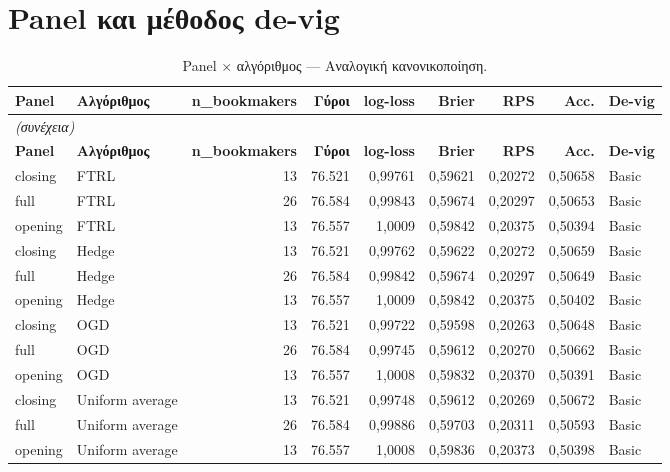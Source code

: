 \section{Panel και μέθοδος de-vig}
{\scriptsize
\begin{longtable}{@{}llrrrrrrl@{}}
\caption{Panel $\times$ αλγόριθμος --- Αναλογική κανονικοποίηση.}\label{app:opening_vs_cΑναλ}\\
\toprule \textbf{Panel} & \textbf{Αλγόριθμος} & \textbf{n\_bookmakers} & \textbf{Γύροι} & \textbf{log-loss} & \textbf{Brier} & \textbf{RPS} & \textbf{Acc.} & \textbf{De-vig} \\\midrule\endfirsthead
\multicolumn{9}{l}{\emph{(συνέχεια)}}\\\toprule \textbf{Panel} & \textbf{Αλγόριθμος} & \textbf{n\_bookmakers} & \textbf{Γύροι} & \textbf{log-loss} & \textbf{Brier} & \textbf{RPS} & \textbf{Acc.} & \textbf{De-vig} \\\midrule\endhead
\bottomrule\endfoot
closing & FTRL & 13 & 76.521 & 0,99761 & 0,59621 & 0,20272 & 0,50658 & Basic \\
full & FTRL & 26 & 76.584 & 0,99843 & 0,59674 & 0,20297 & 0,50653 & Basic \\
opening & FTRL & 13 & 76.557 & 1,0009 & 0,59842 & 0,20375 & 0,50394 & Basic \\
closing & Hedge & 13 & 76.521 & 0,99762 & 0,59622 & 0,20272 & 0,50659 & Basic \\
full & Hedge & 26 & 76.584 & 0,99842 & 0,59674 & 0,20297 & 0,50649 & Basic \\
opening & Hedge & 13 & 76.557 & 1,0009 & 0,59842 & 0,20375 & 0,50402 & Basic \\
closing & OGD & 13 & 76.521 & 0,99722 & 0,59598 & 0,20263 & 0,50648 & Basic \\
full & OGD & 26 & 76.584 & 0,99745 & 0,59612 & 0,20270 & 0,50662 & Basic \\
opening & OGD & 13 & 76.557 & 1,0008 & 0,59832 & 0,20370 & 0,50391 & Basic \\
closing & Uniform average & 13 & 76.521 & 0,99748 & 0,59612 & 0,20269 & 0,50672 & Basic \\
full & Uniform average & 26 & 76.584 & 0,99886 & 0,59703 & 0,20311 & 0,50593 & Basic \\
opening & Uniform average & 13 & 76.557 & 1,0008 & 0,59836 & 0,20373 & 0,50398 & Basic \\
\end{longtable}
}

